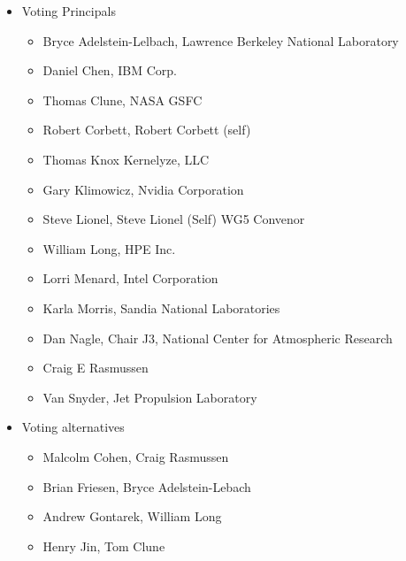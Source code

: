 \documentclass[10pt,letterpaper,twoside]{article}
\begin{document}
\begin{itemize}

\item{Voting Principals}

\begin{itemize}

\item{Bryce Adelstein-Lelbach, Lawrence Berkeley National Laboratory}

\item{Daniel Chen, IBM Corp.}

\item{Thomas Clune, NASA GSFC}

\item{Robert Corbett, Robert Corbett (self)}

\item{Thomas Knox Kernelyze, LLC}

\item{Gary Klimowicz, Nvidia Corporation}

\item{Steve Lionel, Steve Lionel (Self) WG5 Convenor}

\item{William Long, HPE Inc.}

\item{Lorri Menard, Intel Corporation}

\item{Karla Morris, Sandia National Laboratories}

\item{Dan Nagle, Chair J3, National Center for Atmospheric Research}

\item{Craig E Rasmussen}

\item{Van Snyder, Jet Propulsion Laboratory}

\end{itemize}

\item{Voting alternatives}

\begin{itemize}

\item{Malcolm Cohen, Craig Rasmussen}

\item{Brian Friesen, Bryce Adelstein-Lebach}

\item{Andrew Gontarek, William Long}

\item{Henry Jin, Tom Clune}


\end{itemize}
\end{itemize}
\end{document}

